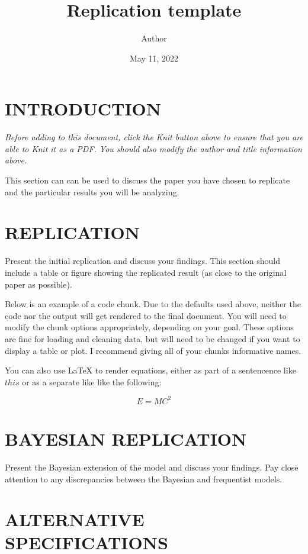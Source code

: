 \documentclass[
  12pt,
]{article}
\title{Replication template}
\author{Author}
\date{May 11, 2022}
\begin{document}
\maketitle

\hypertarget{introduction}{%
\section{INTRODUCTION}\label{introduction}}

\emph{Before adding to this document, click the Knit button above to
ensure that you are able to Knit it as a PDF. You should also modify the
author and title information above.}

This section can can be used to discuss the paper you have chosen to
replicate and the particular results you will be analyzing.

\hypertarget{replication}{%
\section{REPLICATION}\label{replication}}

Present the initial replication and discuss your findings. This section
should include a table or figure showing the replicated result (as close
to the original paper as possible).

Below is an example of a code chunk. Due to the defaults used above,
neither the code nor the output will get rendered to the final document.
You will need to modify the chunk options appropriately, depending on
your goal. These options are fine for loading and cleaning data, but
will need to be changed if you want to display a table or plot. I
recommend giving all of your chunks informative names.

You can also use LaTeX to render equations, either as part of a
sentencence like \(this\) or as a separate like like the following:

\[E = MC^2\]

\hypertarget{bayesian-replication}{%
\section{BAYESIAN REPLICATION}\label{bayesian-replication}}

Present the Bayesian extension of the model and discuss your findings.
Pay close attention to any discrepancies between the Bayesian and
frequentist models.

\hypertarget{alternative-specifications}{%
\section{ALTERNATIVE SPECIFICATIONS}\label{alternative-specifications}}
\end{document}
